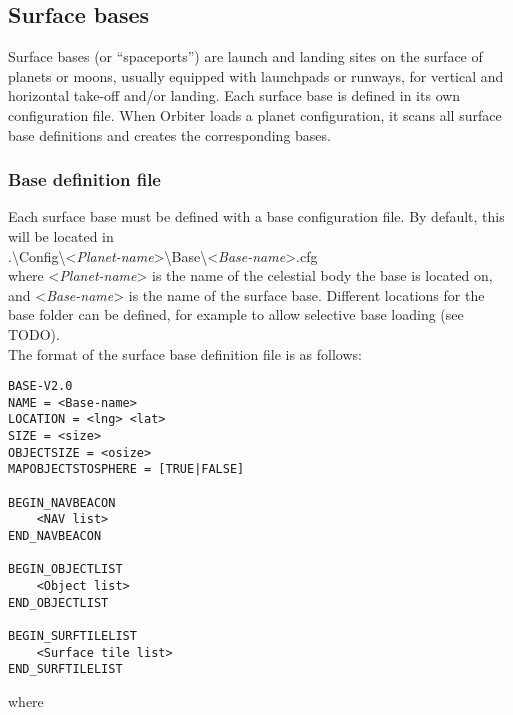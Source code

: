 \documentclass[Orbiter Developer Manual.tex]{subfiles}
\begin{document}
\subsection{Surface bases}
Surface bases (or “spaceports”) are launch and landing sites on the surface of planets or moons, usually equipped with launchpads or runways, for vertical and horizontal take-off and/or landing. Each surface base is defined in its own configuration file. When Orbiter loads a planet configuration, it scans all surface base definitions and creates the corresponding bases.

\subsubsection*{Base definition file}
Each surface base must be defined with a base configuration file. By default, this will be located in\\
.\textbackslash Config\textbackslash <\textit{Planet-name}>\textbackslash Base\textbackslash <\textit{Base-name}>.cfg\\
where <\textit{Planet-name}> is the name of the celestial body the base is located on, and <\textit{Base-name}> is the name of the surface base. Different locations for the base folder can be defined, for example to allow selective base loading (see TODO).\\
The format of the surface base definition file is as follows:

\begin{lstlisting}[language=OSFS]
BASE-V2.0
NAME = <Base-name>
LOCATION = <lng> <lat>
SIZE = <size>
OBJECTSIZE = <osize>
MAPOBJECTSTOSPHERE = [TRUE|FALSE]

BEGIN_NAVBEACON
	<NAV list>
END_NAVBEACON

BEGIN_OBJECTLIST
	<Object list>
END_OBJECTLIST

BEGIN_SURFTILELIST
	<Surface tile list>
END_SURFTILELIST
\end{lstlisting}

\noindent
where
\end{document}
